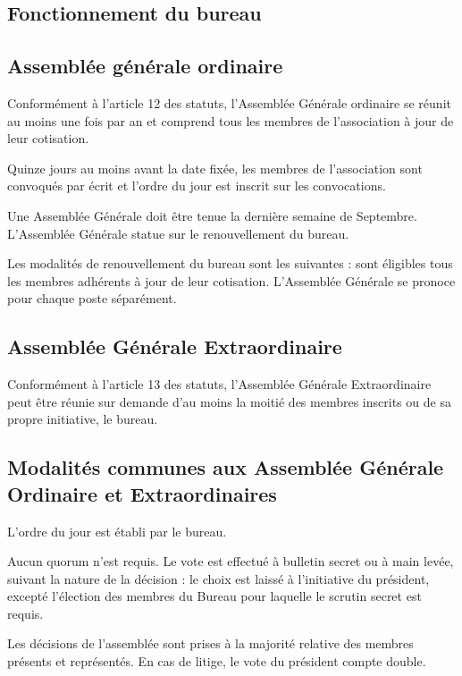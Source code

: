 \documentclass[a4paper,french,10pt]{article}
\begin{document}
\subsection{Fonctionnement du bureau}

\subsection{Assemblée générale ordinaire}
Conformément à l'article 12 des statuts, l’Assemblée Générale ordinaire se réunit au moins une fois par an et comprend tous les membres de l’association à jour de leur cotisation.

Quinze jours au moins avant la date fixée, les membres de l’association sont convoqués par écrit et l’ordre du jour est inscrit sur les convocations.

Une Assemblée Générale doit être tenue la dernière semaine de Septembre. L'Assemblée Générale statue sur le renouvellement du bureau.

Les modalités de renouvellement du bureau sont les suivantes : sont éligibles tous les membres adhérents à jour de leur cotisation. L'Assemblée Générale se pronoce pour chaque poste séparément.

\subsection{Assemblée Générale Extraordinaire}
\label{sec:age}
Conformément à l'article 13 des statuts, l'Assemblée Générale Extraordinaire peut être réunie sur demande d'au moins la moitié des membres inscrits ou de sa propre initiative, le bureau.
\subsection{Modalités communes aux Assemblée Générale Ordinaire et Extraordinaires}
\label{sec:ag}
L'ordre du jour est établi par le bureau. %

Aucun quorum n'est requis. Le vote est effectué à bulletin secret ou à
main levée, suivant la nature de la décision : le choix est laissé à
l'initiative du président, excepté l'élection des membres du Bureau
pour laquelle le scrutin secret est requis.

Les décisions de l’assemblée sont prises à la majorité relative des
membres présents et représentés. En cas de litige, le vote du
président compte double.
\end{document}
